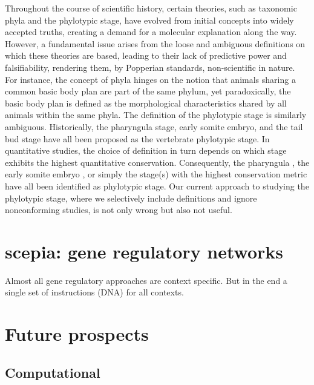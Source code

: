Throughout the course of scientific history, certain theories, such as taxonomic phyla and the phylotypic stage, have evolved from initial concepts into widely accepted truths, creating a demand for a molecular explanation along the way. However, a fundamental issue arises from the loose and ambiguous definitions on which these theories are based, leading to their lack of predictive power and falsifiability, rendering them, by Popperian standards, non-scientific in nature. For instance, the concept of phyla hinges on the notion that animals sharing a common basic body plan are part of the same phylum, yet paradoxically, the basic body plan is defined as the morphological characteristics shared by all animals within the same phyla\cite{BUDD2000}. The definition of the phylotypic stage is similarly ambiguous. Historically, the pharyngula stage\cite{https://doi.org/10.1093/icb/21.2.391}, early somite embryo\cite{ https://doi.org/10.1046/j.1420-9101.1993.6030457.x}, and the tail bud stage \cite{Slack1993} have all been proposed as the vertebrate phylotypic stage. In quantitative studies, the choice of definition in turn depends on which stage exhibits the highest quantitative conservation. Consequently, the pharyngula \cite{Irie2011,marletaz2018}, the early somite embryo \cite{DomazetLoso2010}, or simply the stage(s) with the highest conservation metric\cite{Kalinka2010,Cordero2020} have all been identified as phylotypic stage. Our current approach to studying the phylotypic stage, where we selectively include definitions and ignore nonconforming studies, is not only wrong but also not useful.

\section{scepia: gene regulatory networks}

Almost all gene regulatory approaches are context specific. But in the end a single set of instructions (DNA) for all contexts.


\section{Future prospects}

\subsection{Computational}

